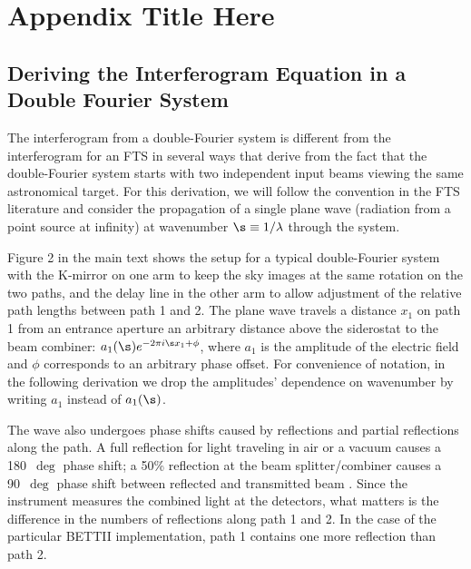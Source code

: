 
\chapter{Appendix Title Here} %

\label{AppendixA} %

\section{Deriving the Interferogram Equation in a Double Fourier System}
\label{ap:interfero}
The interferogram from a double-Fourier system is different from the interferogram
for an FTS in several ways that derive from the fact
that the double-Fourier system starts with two independent input beams viewing the same astronomical target. For this derivation,
we will follow the convention in the FTS literature and consider the propagation of a single plane wave (radiation from a point source at infinity) at wavenumber $\s\equiv{1/\lambda}$ through the system.

Figure 2 in the main text shows the setup for a typical double-Fourier system with the K-mirror on one
arm to keep the sky images at the same rotation on the two paths, and the delay line
in the other arm to allow adjustment of the relative path lengths between path 1 and 2.
The plane wave travels a distance $x_1$ on path 1 from an entrance aperture an arbitrary distance
above the siderostat to the beam combiner: $a_1(\s) e^{-2\pi i \s x_1+\phi}$,
where $a_1$ is the amplitude of the electric field and $\phi$ corresponds to an arbitrary phase offset. For convenience of notation, in the following derivation we drop the amplitudes' dependence on wavenumber by writing $a_1$ instead of $a_1(\s)$.

The wave also undergoes phase shifts caused by reflections and partial reflections along
the path. A full reflection for light traveling in air or a vacuum causes a 180~$\deg$ phase shift;
a 50\% reflection at the beam splitter/combiner causes a 90~$\deg$ phase shift between reflected and transmitted beam \citep{2000plbs.conf.....L}. Since the instrument
measures the combined light at the detectors, what matters is the difference in the
numbers of reflections along path 1 and 2. In the case of the particular BETTII implementation, path 1 contains one more reflection than path 2.

